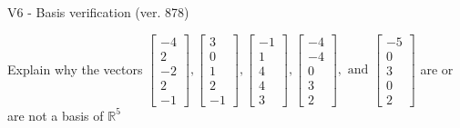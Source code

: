 \begin{exercise}
  \begin{exerciseTitle}V6 - Basis verification (ver. 878)\end{exerciseTitle}
  \begin{exerciseStatement}
    Explain why the vectors \(\left[\begin{array}{r}
-4 \\
2 \\
-2 \\
2 \\
-1
\end{array}\right] , \left[\begin{array}{r}
3 \\
0 \\
1 \\
2 \\
-1
\end{array}\right] , \left[\begin{array}{r}
-1 \\
1 \\
4 \\
4 \\
3
\end{array}\right] , \left[\begin{array}{r}
-4 \\
-4 \\
0 \\
3 \\
2
\end{array}\right] , \text{ and } \left[\begin{array}{r}
-5 \\
0 \\
3 \\
0 \\
2
\end{array}\right]\) are or are not a basis of \(\mathbb{R}^5\)	



\end{exerciseStatement}
\end{exercise}
